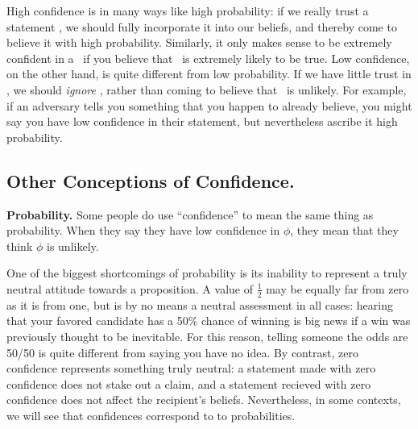 High confidence is in many ways like high probability: if we really trust a statement \stmt, we should fully incorporate it into our beliefs, and thereby come to believe it with high probability.
Similarly, it only makes sense to be extremely confident in a \stmt\ if you believe that \stmt\ is extremely likely to be true.
Low confidence, on the other hand, is quite different from low probability.
If we have little trust in \stmt, we should \emph{ignore} \stmt, rather than coming to believe that \stmt\ is unlikely.
For example, if an adversary tells you something that you happen to already believe,
you might say you have low confidence in their statement, but nevertheless ascribe it high probability.


\subsection{Other Conceptions of Confidence.}

\textbf{Probability.}
Some people do use ``confidence'' to mean the same thing as probability. When they say they have low confidence in $\phi$, they mean that they think $\phi$ is unlikely.

One of the biggest shortcomings of probability is its inability to represent a truly neutral attitude towards a proposition.
A value of $\frac12$ may be equally far from zero as it is from one, but is by no means a neutral assessment in all cases: hearing that your favored candidate has a 50\% chance of winning is big news if a win was previously thought to be inevitable.
For this reason, telling someone the odds are 50/50 is quite different from saying you have no idea.
By contrast, zero confidence represents something truly neutral:
	a statement made with zero confidence does not stake out a claim, and
	a statement recieved with zero confidence does not affect the recipient's beliefs.
Nevertheless, in some contexts, we will see that confidences correspond to to probabilities.

